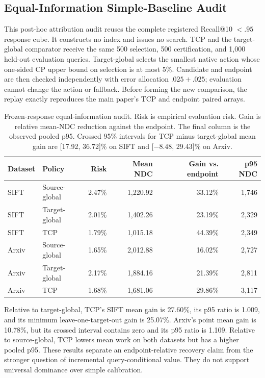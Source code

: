 \documentclass[sigconf,anonymous]{acmart}
\begin{document}
\subsection{Equal-Information Simple-Baseline Audit}
This post-hoc attribution audit reuses the complete registered Recall@10 $<.95$ response cube. It constructs no index and issues no search. TCP and the target-global comparator receive the same 500 selection, 500 certification, and 1,000 held-out evaluation queries. Target-global selects the smallest native action whose one-sided CP upper bound on selection is at most 5\%. Candidate and endpoint are then checked independently with error allocation $.025+.025$; evaluation cannot change the action or fallback. Before forming the new comparison, the replay exactly reproduces the main paper's TCP and endpoint paired arrays.

\begin{table}[t]
\caption{Frozen-response equal-information audit. Risk is empirical evaluation risk. Gain is relative mean-NDC reduction against the endpoint. The final column is the observed pooled p95. Crossed 95\% intervals for TCP minus target-global mean gain are [17.92, 36.72]\% on SIFT and [$-8.48$, 29.43]\% on Arxiv.}
\label{tab:equal-info}
\small\begin{tabular*}{\textwidth}{@{\extracolsep{\fill}}llrrrr@{}}\toprule
Dataset & Policy & Risk & Mean NDC & Gain vs. endpoint & p95 NDC\\\midrule
SIFT & Source-global & 2.47\% & 1,220.92 & 33.12\% & 1,746\\
SIFT & Target-global & 2.01\% & 1,402.26 & 23.19\% & 2,329\\
SIFT & TCP & 1.79\% & 1,015.18 & 44.39\% & 2,349\\
Arxiv & Source-global & 1.65\% & 2,012.88 & 16.02\% & 2,727\\
Arxiv & Target-global & 2.17\% & 1,884.16 & 21.39\% & 2,811\\
Arxiv & TCP & 1.68\% & 1,681.06 & 29.86\% & 3,117\\\bottomrule
\end{tabular*}
\end{table}

Relative to target-global, TCP's SIFT mean gain is 27.60\%, its p95 ratio is 1.009, and its minimum leave-one-target-out gain is 25.07\%. Arxiv's point mean gain is 10.78\%, but its crossed interval contains zero and its p95 ratio is 1.109. Relative to source-global, TCP lowers mean work on both datasets but has a higher pooled p95. These results separate an endpoint-relative recovery claim from the stronger question of incremental query-conditional value. They do not support universal dominance over simple calibration.
\end{document}
